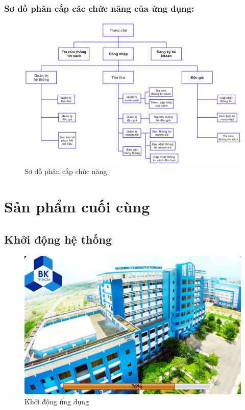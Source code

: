\documentclass[12pt]{report}
\begin{document}
		\subsection{Sơ đồ phân cấp các chức năng của ứng dụng:}
			\begin{figure}[H]
				\centering
				\includegraphics[scale=0.25]{images/TFHD.png}
				\caption{Sơ đồ phân cấp chức năng}
				\label{fig:tfhd}
			\end{figure}
	\chapter{Sản phẩm cuối cùng}
				\section{Khởi động hệ thống}
					\begin{figure}[H]
						\centering
						\includegraphics[scale=0.8]{images/startup.png}
						\caption{Khởi động ứng dụng}
						\label{fig:startup}
					\end{figure}
\end{document}
